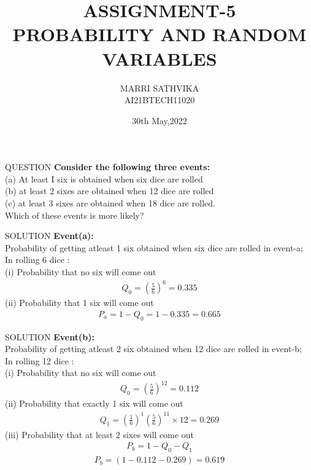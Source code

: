 \documentclass{beamer}
\title{ASSIGNMENT-5 \\ PROBABILITY AND RANDOM VARIABLES}
\author{MARRI SATHVIKA \\ AI21BTECH11020}
\date{30th May,2022}
\begin{document}
\begin{frame}
    \titlepage 
\end{frame}

\begin{frame}{QUESTION}
\textbf{Consider the following three events:}\\ (a) At least I six is obtained when six dice are rolled\\ (b) at least 2 sixes are obtained when 12 dice are rolled\\ (c) at least 3 sixes are obtained when 18 dice are rolled.\\Which of these events is more likely? 
\end{frame}

\begin{frame}{SOLUTION}
\textbf{Event(a):}\\
Probability of getting atleast 1 six obtained when six dice are rolled in event-a;\\
In rolling 6 dice : \\(i) Probability that no six will come out
\begin{align}
   Q_0 = (\frac{5}{6})^6 = 0.335 
\end{align}
(ii) Probability that 1 six will come out 
\begin{align}
   P_a = 1 - Q_0 = 1 - 0.335 = 0.665
\end{align}
\end{frame}

\begin{frame}{SOLUTION}
\textbf{Event(b): }\\
Probability of getting atleast 2 six obtained when 12 dice are rolled in event-b;\\
In rolling 12 dice : \\(i) Probability that no six will come out
\begin{align}
    Q_0 = (\frac{5}{6})^{12} = 0.112 
\end{align}
(ii) Probability that exactly 1 six will come out
\begin{align}
   Q_1=(\frac{1}{6})^1 (\frac{5}{6})^{11} \times 12 = 0.269 
\end{align}
(iii) Probability that at least 2 sixes will come out
\begin{align}
    P_b = 1-Q_0-Q_1
\end{align}
\begin{align}
    P_b = (1 - 0.112 - 0.269) = 0.619
\end{align}
\end{frame}
\end{document}
